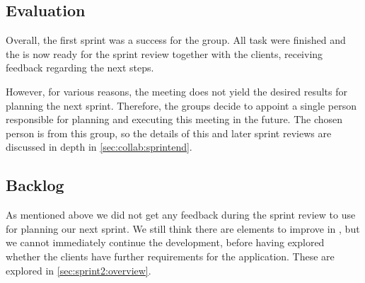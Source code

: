 \subsection{Evaluation}
Overall, the first sprint was a success for the group.
All task were finished and the \launcher is now ready for the sprint review together with the clients, receiving feedback regarding the next steps.

However, for various reasons, the meeting does not yield the desired results for planning the next sprint.
Therefore, the groups decide to appoint a single person responsible for planning and executing this meeting in the future.
The chosen person is from this group, so the details of this and later sprint reviews are discussed in depth in \cref{sec:collab:sprintend}.

\subsection{Backlog}
As mentioned above we did not get any feedback during the sprint review to use for planning our next sprint.
We still think there are elements to improve in \launcher, but we cannot immediately continue the development, before having explored whether the clients have further requirements for the application.
These are explored in \cref{sec:sprint2:overview}.